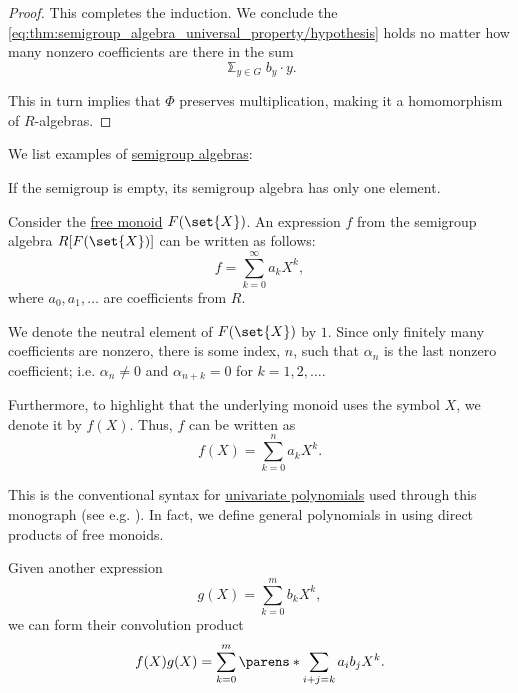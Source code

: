 \begin{proof}
  This completes the induction. We conclude the \eqref{eq:thm:semigroup_algebra_universal_property/hypothesis} holds no matter how many nonzero coefficients are there in the sum
  \begin{equation*}
    \Bbbsum_{y \in G} b_y \cdot y.
  \end{equation*}

  This in turn implies that \( \Phi \) preserves multiplication, making it a homomorphism of \( R \)-algebras.
\end{proof}

\begin{example}\label{ex:def:semigroup_algebra}
  We list examples of \hyperref[def:semigroup_algebra]{semigroup algebras}:
  \begin{thmenum}
     If the semigroup is empty, its semigroup algebra has only one element.

     Consider the \hyperref[def:free_monoid]{free monoid} \( F(\set{ X }) \). An expression \( f \) from the semigroup algebra \( R[F(\set{ X })] \) can be written as follows:
    \begin{equation*}
      f = \sum_{k=0}^\infty a_k X^k,
    \end{equation*}
    where \( a_0, a_1, \ldots \) are coefficients from \( R \).

    We denote the neutral element of \( F(\set{ X }) \) by \( 1 \). Since only finitely many coefficients are nonzero, there is some index, \( n \), such that \( \alpha_n \) is the last nonzero coefficient; i.e. \( \alpha_n \neq 0 \) and \( \alpha_{n+k} = 0 \) for \( k = 1, 2, \ldots \).

    Furthermore, to highlight that the underlying monoid uses the symbol \( X \), we denote it by \( f(X) \). Thus, \( f \) can be written as
    \begin{equation*}
      f(X) = \sum_{k=0}^n a_k X^k.
    \end{equation*}

    This is the conventional syntax for \hyperref[def:univariate_polynomial]{univariate polynomials} used through this monograph (see e.g. ). In fact, we define general polynomials in  using direct products of free monoids.

    Given another expression
    \begin{equation*}
      g(X) = \sum_{k=0}^m b_k X^k,
    \end{equation*}
    we can form their convolution product
    \begin{equation}\label{ex:def:semigroup_algebra/natural/convolution}
      f(X) g(X) = \sum_{k=0}^m \parens*{ \sum_{i+j=k} a_i b_j } X^k.
    \end{equation}


\end{thmenum}
\end{example}
